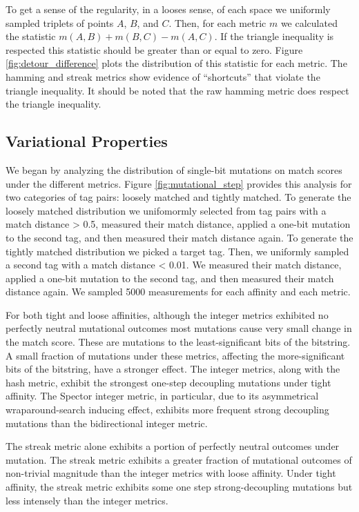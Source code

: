 

To get a sense of the regularity, in a looses sense, of each space we uniformly sampled triplets of points $A$, $B$, and $C$.
Then, for each metric $m$ we calculated the statistic $m(A, B) + m(B, C) - m(A, C)$.
If the triangle inequality is respected this statistic should be greater than or equal to zero.
Figure \ref{fig:detour_difference} plots the distribution of this statistic for each metric.
The hamming and streak metrics show evidence of ``shortcuts'' that violate the triangle inequality.
It should be noted that the raw hamming metric does respect the triangle inequality.

\subsection{Variational Properties}



We began by analyzing the distribution of single-bit mutations on match scores under the different metrics.
Figure \ref{fig:mutational_step} provides this analysis for two categories of tag pairs: loosely matched and tightly matched.
To generate the loosely matched distribution we unifomormly selected from tag pairs with a match distance > 0.5, measured their match distance, applied a one-bit mutation to the second tag, and then measured their match distance again.
To generate the tightly matched distribution we picked a target tag.
Then, we uniformly sampled a second tag with a match distance < 0.01.
We measured their match distance, applied a one-bit mutation to the second tag, and then measured their match distance again.
We sampled 5000 measurements for each affinity and each metric.

For both tight and loose affinities, although the integer metrics exhibited no perfectly neutral mutational outcomes most mutations cause very small change in the match score.
These are mutations to the least-significant bits of the bitstring.
A small fraction of mutations under these metrics, affecting the more-significant bits of the bitstring, have a stronger effect.
The integer metrics, along with the hash metric, exhibit the strongest one-step decoupling mutations under tight affinity.
The Spector integer metric, in particular, due to its asymmetrical wraparound-search inducing effect, exhibits more frequent strong decoupling mutations than the bidirectional integer metric.

The streak metric alone exhibits a portion of perfectly neutral outcomes under mutation.
The streak metric exhibits a greater fraction of mutational outcomes of non-trivial magnitude than the integer metrics with loose affinity.
Under tight affinity, the streak metric exhibits some one step strong-decoupling mutations but less intensely than the integer metrics.


